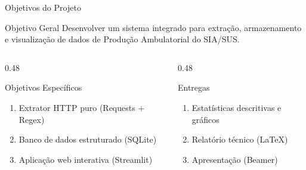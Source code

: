 \documentclass[aspectratio=169,10pt]{beamer}
\begin{document}
\begin{frame}{Objetivos do Projeto}

\begin{block}{Objetivo Geral}
Desenvolver um sistema integrado para extração, armazenamento e visualização de dados de Produção Ambulatorial do SIA/SUS.
\end{block}

\vspace{0.5cm}

\begin{columns}[T]
\begin{column}{0.48\textwidth}
    \begin{alertblock}{Objetivos Específicos}
    \begin{enumerate}
        \item Extrator HTTP puro (Requests + Regex)
        \item Banco de dados estruturado (SQLite)
        \item Aplicação web interativa (Streamlit)
    \end{enumerate}
    \end{alertblock}
\end{column}
\begin{column}{0.48\textwidth}
    \begin{exampleblock}{Entregas}
    \begin{enumerate}
        \item[4.] Estatísticas descritivas e gráficos
        \item[5.] Relatório técnico (LaTeX)
        \item[6.] Apresentação (Beamer)
    \end{enumerate}
    \end{exampleblock}
\end{column}
\end{columns}

\end{frame}

\end{document}
